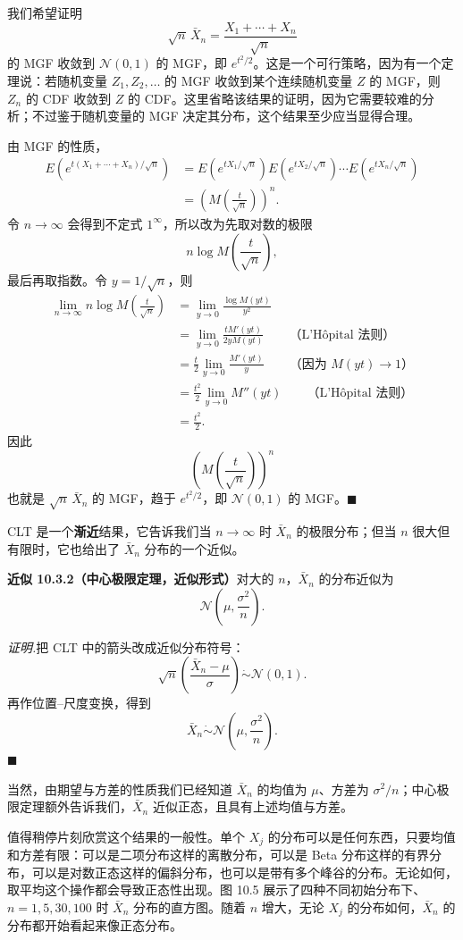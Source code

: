 \documentclass[UTF8, 12pt, fontset=fandol, oneside]{ctexart}
\begin{document}
我们希望证明
\[
  \sqrt n\,\bar X_n=\frac{X_1+\cdots+X_n}{\sqrt n}
\]
的 MGF 收敛到 $\mathcal N(0,1)$ 的 MGF，即 $e^{t^2/2}$。这是一个可行策略，因为有一个定理说：若随机变量 $Z_1,Z_2,\ldots$ 的 MGF 收敛到某个连续随机变量 $Z$ 的 MGF，则 $Z_n$ 的 CDF 收敛到 $Z$ 的 CDF。这里省略该结果的证明，因为它需要较难的分析；不过鉴于随机变量的 MGF 决定其分布，这个结果至少应当显得合理。

由 MGF 的性质，
\[
\begin{aligned}
  E\left(e^{t(X_1+\cdots+X_n)/\sqrt n}\right)
  &=E(e^{tX_1/\sqrt n})E(e^{tX_2/\sqrt n})\cdots E(e^{tX_n/\sqrt n})\\
  &=\left(M\left(\frac{t}{\sqrt n}\right)\right)^n.
\end{aligned}
\]
令 $n\to\infty$ 会得到不定式 $1^\infty$，所以改为先取对数的极限
\[
  n\log M\left(\frac{t}{\sqrt n}\right),
\]
最后再取指数。令 $y=1/\sqrt n$，则
\[
\begin{aligned}
  \lim_{n\to\infty}n\log M\left(\frac{t}{\sqrt n}\right)
  &=\lim_{y\to 0}\frac{\log M(yt)}{y^2}\\
  &=\lim_{y\to 0}\frac{tM'(yt)}{2yM(yt)} \qquad \text{（L'Hôpital 法则）}\\
  &=\frac{t}{2}\lim_{y\to 0}\frac{M'(yt)}{y}\qquad \text{（因为 $M(yt)\to 1$）}\\
  &=\frac{t^2}{2}\lim_{y\to 0}M''(yt)\qquad \text{（L'Hôpital 法则）}\\
  &=\frac{t^2}{2}.
\end{aligned}
\]
因此
\[
  \left(M\left(\frac{t}{\sqrt n}\right)\right)^n
\]
也就是 $\sqrt n\,\bar X_n$ 的 MGF，趋于 $e^{t^2/2}$，即 $\mathcal N(0,1)$ 的 MGF。$\blacksquare$

CLT 是一个\textbf{渐近}结果，它告诉我们当 $n\to\infty$ 时 $\bar X_n$ 的极限分布；但当 $n$ 很大但有限时，它也给出了 $\bar X_n$ 分布的一个近似。

\noindent\textbf{近似 10.3.2（中心极限定理，近似形式）}\quad 对大的 $n$，$\bar X_n$ 的分布近似为
\[
  \mathcal N\left(\mu,\frac{\sigma^2}{n}\right).
\]

\noindent\textit{证明.}\quad 把 CLT 中的箭头改成近似分布符号：
\[
  \sqrt n\left(\frac{\bar X_n-\mu}{\sigma}\right)\dot\sim \mathcal N(0,1).
\]
再作位置--尺度变换，得到
\[
  \bar X_n\dot\sim\mathcal N\left(\mu,\frac{\sigma^2}{n}\right).
\]
$\blacksquare$

当然，由期望与方差的性质我们已经知道 $\bar X_n$ 的均值为 $\mu$、方差为 $\sigma^2/n$；中心极限定理额外告诉我们，$\bar X_n$ 近似正态，且具有上述均值与方差。

值得稍停片刻欣赏这个结果的一般性。单个 $X_j$ 的分布可以是任何东西，只要均值和方差有限：可以是二项分布这样的离散分布，可以是 Beta 分布这样的有界分布，可以是对数正态这样的偏斜分布，也可以是带有多个峰谷的分布。无论如何，取平均这个操作都会导致正态性出现。图 10.5 展示了四种不同初始分布下、$n=1,5,30,100$ 时 $\bar X_n$ 分布的直方图。随着 $n$ 增大，无论 $X_j$ 的分布如何，$\bar X_n$ 的分布都开始看起来像正态分布。
\end{document}
